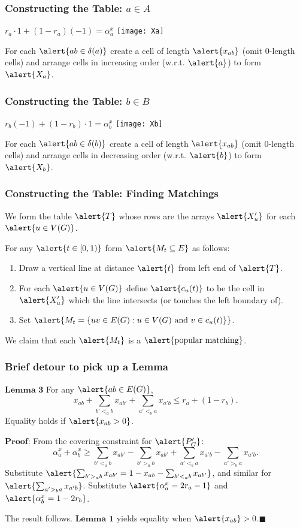 \documentclass[10pt]{beamer}
\begin{document}
\begin{frame}
\frametitle{Constructing the Table: $a \in A$}
\centering
$r_a\cdot 1 + (1-r_a)(-1) = \alpha^x_a$ 
\texttt{[image: Xa]}

For each $\alert{ab \in \delta(a)}$ create a cell of length $\alert{x_{ab}}$ (omit $0$-length cells) and arrange cells in increasing order (w.r.t. $\alert{a}$) to form $\alert{X_a}$.
\end{frame}

\begin{frame}
\frametitle{Constructing the Table: $b \in B$}
\centering
$r_b(-1) + (1-r_b)\cdot 1 = \alpha^x_b$
\texttt{[image: Xb]}

For each $\alert{ab \in \delta(b)}$ create a cell of length $\alert{x_{ab}}$ (omit $0$-length cells) and arrange cells in decreasing order (w.r.t. $\alert{b}$) to form $\alert{X_b}$.
\end{frame}

\begin{frame}
\frametitle{Constructing the Table: Finding Matchings}
We form the table $\alert{T}$ whose rows are the arrays $\alert{X'_u}$ for each $\alert{u \in V(G)}$.

For any $\alert{t \in [0,1)}$ form $\alert{M_t\subseteq E}$ as follows:
\begin{enumerate}
\item Draw a vertical line at distance $\alert{t}$ from left end of $\alert{T}$.
\item For each $\alert{u \in V(G)}$ define $\alert{c_u(t)}$ to be the cell in $\alert{X'_u}$ which the line intersects (or touches the left boundary of).
\item Set $\alert{M_t = \{ uv \in E(G) : u \in V(G) \text{ and } v \in c_u(t)\}}$.
\end{enumerate}

We claim that each $\alert{M_t}$ is a $\text{\alert{popular matching}}$.
\end{frame}

\begin{frame}
\frametitle{Brief detour to pick up a Lemma}
$\textbf{Lemma 3}$ For any $\alert{ab \in E(G)}$,
$$ x_{ab} + \sum_{b' <_a b} x_{ab'} + \sum_{a' <_b a} x_{a'b} \leq r_a + (1-r_b).$$
Equality holds if $\alert{x_{ab} > 0}$.

$\textbf{Proof:}$
From the covering constraint for $\alert{P'_G}$:
$$\alpha^x_a + \alpha^x_b \geq \sum_{b' <_a b} x_{ab'} - \sum_{b' >_a b} x_{ab'} + \sum_{a' <_b a} x_{a'b} - \sum_{a' >_b a} x_{a'b}.$$
Substitute $\alert{\sum_{b' >_a b} x_{ab'} = 1- x_{ab} - \sum_{b'<_a b} x_{ab'}}$, and similar for $\alert{\sum_{a' >_b a}x_{a'b}}$. Substitute $\alert{\alpha^x_a = 2r_a -1}$ and $\alert{\alpha^x_b = 1-2r_b}$.

The result follows. $\textbf{Lemma 1}$ yields equality when $\alert{x_{ab}} > 0$.$\blacksquare$
\end{frame}
\end{document}
